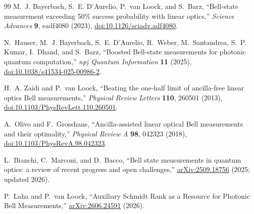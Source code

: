 \documentclass[11pt]{article}
\theoremstyle{remark}
\begin{document}
\begin{thebibliography}{99}
M.~J. Bayerbach, S.~E. D'Aurelio, P.~van Loock, and S.~Barz,
``Bell-state measurement exceeding 50\% success probability with linear optics,''
\emph{Science Advances} \textbf{9}, eadf4080 (2023),
\href{https://doi.org/10.1126/sciadv.adf4080}{doi:10.1126/sciadv.adf4080}.

N.~Hauser, M.~J. Bayerbach, S.~E. D'Aurelio, R.~Weber, M.~Santandrea,
S.~P. Kumar, I.~Dhand, and S.~Barz,
``Boosted Bell-state measurements for photonic quantum computation,''
\emph{npj Quantum Information} \textbf{11} (2025),
\href{https://doi.org/10.1038/s41534-025-00986-2}{doi:10.1038/s41534-025-00986-2}.

H.~A. Zaidi and P.~van Loock,
``Beating the one-half limit of ancilla-free linear optics Bell measurements,''
\emph{Physical Review Letters} \textbf{110}, 260501 (2013),
\href{https://doi.org/10.1103/PhysRevLett.110.260501}{doi:10.1103/PhysRevLett.110.260501}.

A.~Olivo and F.~Grosshans,
``Ancilla-assisted linear optical Bell measurements and their optimality,''
\emph{Physical Review A} \textbf{98}, 042323 (2018),
\href{https://doi.org/10.1103/PhysRevA.98.042323}{doi:10.1103/PhysRevA.98.042323}.

L.~Bianchi, C.~Marconi, and D.~Bacco,
``Bell state measurements in quantum optics: a review of recent progress and open challenges,''
\href{https://arxiv.org/abs/2509.18756}{arXiv:2509.18756} (2025; updated 2026).

P.~Laha and P.~van Loock,
``Auxiliary Schmidt Rank as a Resource for Photonic Bell Measurements,''
\href{https://arxiv.org/abs/2606.24591}{arXiv:2606.24591} (2026).

\end{thebibliography}
\end{document}
